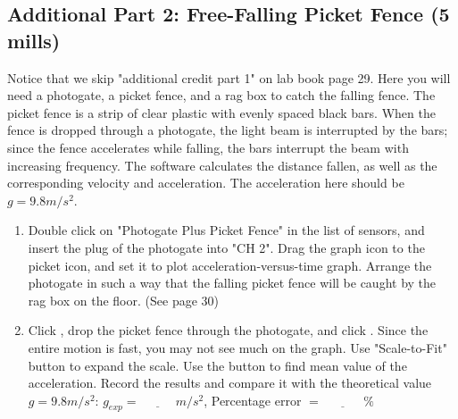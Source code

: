 \documentclass{article}
\begin{document}
\subsection*{Additional Part 2: Free-Falling Picket Fence (5 mills)}
Notice that we skip "additional credit part 1" on lab book page 29. Here you will need a photogate, a picket fence, and a rag box to catch the falling fence. The picket fence is a strip of clear plastic with evenly spaced black bars. When the fence is dropped through a photogate, the light beam is interrupted by the bars; since the fence accelerates while falling, the bars interrupt the beam with increasing frequency. The software calculates the distance fallen, as well as the corresponding velocity and acceleration. The acceleration here should be $g=9.8m/s^2$.

\begin{enumerate}

\item Double click on "Photogate Plus Picket Fence" in the list of sensors, and insert the plug of the photogate into "CH 2". Drag the graph icon to the picket icon, and set it to plot acceleration-versus-time graph. Arrange the photogate in such a way that the falling picket fence will be caught by the rag box on the floor. (See page 30)

\item Click , drop the picket fence through the photogate, and click . Since the entire motion is fast, you may not see much on the graph. Use "Scale-to-Fit" button to expand the scale. Use the \fbox{$\Sigma$} button to find mean value of the acceleration. Record the results and compare it with the theoretical value $g=9.8m/s^2$: $g_{exp}=\underline{~~~~~~~~~~~~~}m/s^2$, Percentage error $=\underline{~~~~~~~~~~~~~~~}\%$

\end{enumerate}
\end{document}
